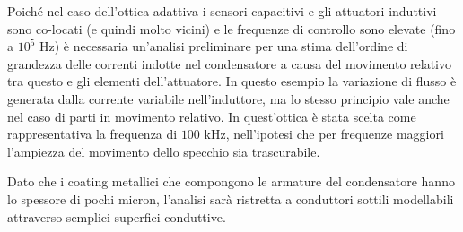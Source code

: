Poiché nel caso dell'ottica adattiva i sensori capacitivi e gli attuatori induttivi sono co-locati (e quindi molto vicini) e le frequenze di controllo sono elevate (fino a $10^5$ Hz)  è necessaria un'analisi preliminare per una stima dell'ordine di grandezza delle correnti indotte nel condensatore a causa del movimento relativo tra questo e gli elementi dell'attuatore. In questo esempio la variazione di flusso è generata dalla corrente variabile nell'induttore, ma lo stesso principio vale anche nel caso di parti in movimento relativo. In quest'ottica è stata scelta come rappresentativa la frequenza di $100$ kHz, nell'ipotesi che per frequenze maggiori l'ampiezza del movimento dello specchio sia trascurabile.

Dato che i coating metallici che compongono le armature del condensatore hanno lo spessore di pochi micron, l'analisi sarà ristretta a conduttori sottili modellabili attraverso semplici superfici conduttive.

